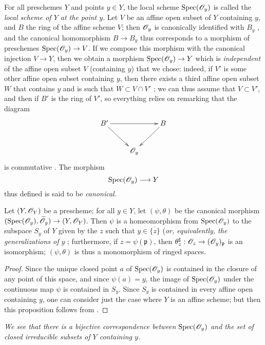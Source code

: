 For all preschemes $Y$ and points $y\in Y$, the local scheme $\operatorname{Spec}(\mathscr{O}_y)$
is called the \emph{local scheme of $Y$ at the point $y$}.
Let $V$ be an affine open subset of $Y$ containing $y$, and $B$ the ring of the affine scheme $V$;
then $\mathscr{O}_y$ is canonically identified with $B_y$ , and the canonical homomorphism $B\to B_y$ thus corresponds  to a morphism of preschemes $\Spec(\sh{O}_y)\to V$.
If we compose this morphism with the canonical injection $V\to Y$, then we obtain a morphism $\Spec(\sh{O}_y)\to Y$ which is \emph{independent} of the affine open subset $V$ (containing $y$) that we chose: indeed, if $V'$ is some other affine open subset containing $y$, then there exists a third affine open subset $W$ that contains $y$ and is such that $W\subset V\cap V'$ ;
we can thus assume that $V\subset V'$, and then if $B'$ is the ring of $V'$, so everything relies on remarking that the diagram
\[
  \xymatrix{
    B'\ar[rr]\ar[dr] & &
    B\ar[dl]\\
    & \sh{O}_y
  }
\]
is commutative .
The morphism
\[
  \Spec(\sh{O}_y)\to Y
\]
thus defined is said to be {\it canonical}.

\begin{proposition}[2.4.2]
\label{I.2.4.2}
Let $(Y,\mathscr{O}_Y)$ be a prescheme;
for all $y\in Y$, let $(\psi,\theta)$ be the canonical morphism $(\Spec(\sh{O}_y),\widetilde{\sh{O}}_y)\to(Y,\sh{O}_Y)$.
Then $\psi$ is a homeomorphism from $\operatorname{Spec}(\mathscr{O}_y)$ to the subspace $S_y$ of $Y$ given by the $z$ such that $y\in\overline{\{z\}}$ (\emph{or, equivalently, the generalizations of $y$ };
furthermore, if $z=\psi(\mathfrak{p})$, then $\theta_z^\sharp:\sh{O}_z\to(\sh{O}_y)_\mathfrak{p}$ is an isomorphism;
$(\psi,\theta)$ is thus a monomorphism of ringed spaces.
\end{proposition}

\begin{proof}
\label{proof-I.2.4.2}
Since the unique closed point $a$ of $\operatorname{Spec}(\mathscr{O}_y)$ is contained in the closure of any point of this space, and since $\psi(a)=y$, the image of $\operatorname{Spec}(\mathscr{O}_y)$ under the continuous map $\psi$ is contained in $S_y$.
Since $S_y$ is contained in every affine open containing $y$, one can consider just the case where $Y$ is an affine scheme;
but then this proposition follows from .
\end{proof}

\emph{We see  that there is a bijective correspondence between $\operatorname{Spec}(\mathscr{O}_y)$ and the set of closed irreducible subsets of $Y$ containing $y$.}

